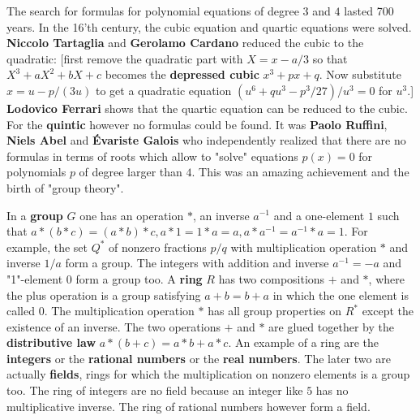 \documentclass[12pt]{amsart}
\newcounter{example}    \def\example#1{ \item \fontsize{12}{15} \selectfont #1 \fontsize{12}{15} \selectfont }
\begin{document}
The search for formulas for polynomial equations of degree $3$ and $4$ lasted 700 years. 
In the 16'th century, the cubic equation and quartic equations were solved. 
{\bf Niccolo Tartaglia} and {\bf Gerolamo Cardano} reduced the cubic to the quadratic:
[first remove the quadratic part with $X=x-a/3$ so that $X^3+aX^2+bX+c$ becomes the 
{\bf depressed cubic} $x^3 + p x + q$. 
Now substitute $x=u-p/(3u)$ to get a quadratic equation $(u^6+qu^3-p^3/27)/u^3=0$ for $u^3$.]
{\bf Lodovico Ferrari} shows that the quartic equation can be reduced to the cubic. 
For the {\bf quintic} however no formulas could be found. 
It was {\bf Paolo Ruffini}, {\bf Niels Abel} and {\bf \'Evariste Galois} who independently 
realized that there are no formulas in terms of roots which allow to "solve" equations 
$p(x)=0$ for polynomials $p$ of degree larger than $4$.
This was an amazing achievement and the birth of "group theory". 

\begin{center}  \end{center}

In a {\bf group} $G$ one has an operation $*$, an inverse $a^{-1}$ and a one-element $1$
such that $a*(b*c) = (a*b)*c, a*1=1*a=a, a*a^{-1} =a^{-1}*a=1$. 
For example, the set $Q^*$ of nonzero fractions $p/q$ with multiplication 
operation $*$ and inverse $1/a$ form a group. The integers with addition and inverse 
$a^{-1} = -a$ and "1"-element $0$ form a group too. 
A {\bf ring} $R$ has two compositions $+$ and $*$, where the plus operation
is a group satisfying $a+b=b+a$ in which the one element is called $0$. The multiplication operation 
$*$ has all group properties on $R^*$ except the existence of an inverse. 
The two operations $+$ and $*$ are glued together by the {\bf distributive law} $a*(b+c) = a*b+a*c$. 
An example of a ring are the {\bf integers} or the {\bf rational numbers} or the
{\bf real numbers}. The later two are actually {\bf fields}, rings for which the 
multiplication on nonzero elements is a group too. 
The ring of integers are no field because an integer like $5$ has no multiplicative inverse. 
The ring of rational numbers however form a field. \\
\end{document}
